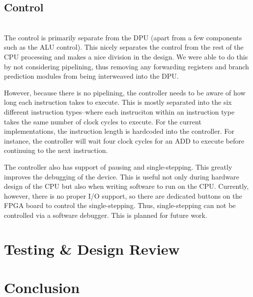 \documentclass[lettersize,journal]{IEEEtran}
\begin{document}
\subsection{Control}
\color{red}{Incomplete...}\color{black}\\
The control is primarily separate from the DPU (apart from a few components such as the ALU control).
This nicely separates the control from the rest of the CPU processing and makes a nice division in the design.
We were able to do this by not considering pipelining, thus removing any forwarding registers and branch prediction modules from being interweaved into the DPU.

However, because there is no pipelining, the controller needs to be aware of how long each instruction takes to execute.
This is mostly separated into the six different instruction types--where each instruciton within an instruction type takes the same number of clock cycles to execute.
For the current implementations, the instruction length is hardcoded into the controller. For instance, the controller will wait four clock cycles for an ADD to execute
before continuing to the next instruction.

The controller also has support of pausing and single-stepping.
This greatly improves the debugging of the device.
This is useful not only during hardware design of the CPU but also when writing software to run on the CPU.
Currently, however, there is no proper I/O support, so there are dedicated buttons on the FPGA board to control the single-stepping.
Thus, single-stepping can not be controlled via a software debugger.
This is planned for future work.

\section{Testing \& Design Review}
\color{red}{TBD}\color{black}

\section{Conclusion}
\color{red}{TBD}\color{black}
\end{document}
